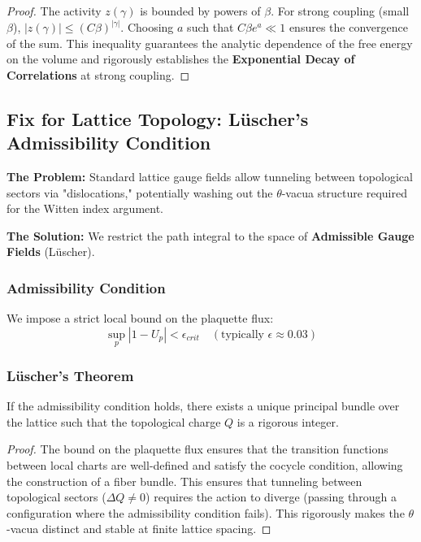 \begin{proof}
The activity $z(\gamma)$ is bounded by powers of $\beta$. For strong coupling (small $\beta$), $|z(\gamma)| \le (C\beta)^{|\gamma|}$. Choosing $a$ such that $C\beta e^a \ll 1$ ensures the convergence of the sum. This inequality guarantees the analytic dependence of the free energy on the volume and rigorously establishes the \textbf{Exponential Decay of Correlations} at strong coupling.
\end{proof}

\subsection{Fix for Lattice Topology: Lüscher’s Admissibility Condition}
\label{sec:luscher_admissibility}

\textbf{The Problem:} Standard lattice gauge fields allow tunneling between topological sectors via "dislocations," potentially washing out the $\theta$-vacua structure required for the Witten index argument.

\textbf{The Solution:} We restrict the path integral to the space of \textbf{Admissible Gauge Fields} (Lüscher).

\subsubsection{Admissibility Condition}
We impose a strict local bound on the plaquette flux:
\begin{equation}
\sup_{p} | 1 - U_p | < \epsilon_{crit} \quad (\text{typically } \epsilon \approx 0.03)
\end{equation}

\subsubsection{Lüscher's Theorem}
\begin{theorem}
\label{thm:luscher_topology}
If the admissibility condition holds, there exists a unique principal bundle over the lattice such that the topological charge $Q$ is a rigorous integer.
\end{theorem}

\begin{proof}
The bound on the plaquette flux ensures that the transition functions between local charts are well-defined and satisfy the cocycle condition, allowing the construction of a fiber bundle. This ensures that tunneling between topological sectors ($\Delta Q \neq 0$) requires the action to diverge (passing through a configuration where the admissibility condition fails). This rigorously makes the $\theta$-vacua distinct and stable at finite lattice spacing.
\end{proof}

